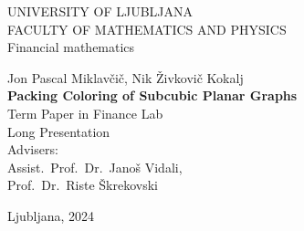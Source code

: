 \documentclass[12pt,a4paper]{amsart}
\theoremstyle{definition}
\theoremstyle{plain}
\newcommand{\program}{Financial mathematics}
\newcommand{\imeavtorja}{Jon Pascal Miklavčič, Nik Živkovič Kokalj}
\newcommand{\imementorja}{Assist.~Prof.~Dr.~Janoš Vidali}
\newcommand{\imesomentorja}{Prof.~Dr.~Riste Škrekovski}
\newcommand{\naslovdela}{Packing Coloring of Subcubic Planar Graphs}
\newcommand{\letnica}{2024}
\begin{document}
\thispagestyle{empty}
{\large
\noindent UNIVERSITY OF LJUBLJANA\\[1mm]
FACULTY OF MATHEMATICS AND PHYSICS\\[5mm]
\program\ }
\vfill

\begin{center}{\large
\imeavtorja\\[2mm]
{\bf \Large \naslovdela}\\[10mm]
{\normalsize Term Paper in Finance Lab}\\[1mm]
{\normalsize Long Presentation}\\[1cm]
{\normalsize Advisers:}\\
{\normalsize \imementorja, \\ \imesomentorja}\\[2mm]}
\end{center}
\vfill

{\large Ljubljana, \letnica}
\pagebreak
\end{document}
